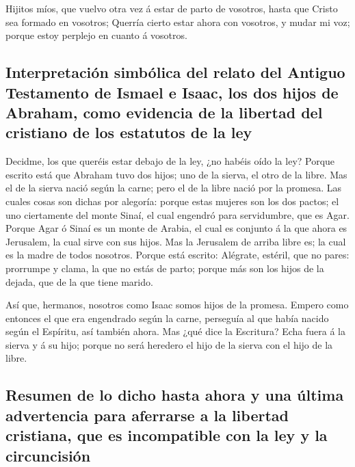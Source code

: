  Hijitos míos, que vuelvo otra vez á estar de parto de
vosotros, hasta que Cristo sea formado en vosotros; 
Querría cierto estar ahora con vosotros, y mudar mi voz; porque estoy
perplejo en cuanto á vosotros.

\hypertarget{interpretaciuxf3n-simbuxf3lica-del-relato-del-antiguo-testamento-de-ismael-e-isaac-los-dos-hijos-de-abraham-como-evidencia-de-la-libertad-del-cristiano-de-los-estatutos-de-la-ley}{%
\subsection{Interpretación simbólica del relato del Antiguo Testamento
de Ismael e Isaac, los dos hijos de Abraham, como evidencia de la
libertad del cristiano de los estatutos de la
ley}\label{interpretaciuxf3n-simbuxf3lica-del-relato-del-antiguo-testamento-de-ismael-e-isaac-los-dos-hijos-de-abraham-como-evidencia-de-la-libertad-del-cristiano-de-los-estatutos-de-la-ley}}

 Decidme, los que queréis estar debajo de la ley, ¿no
habéis oído la ley?  Porque escrito está que Abraham tuvo
dos hijos; uno de la sierva, el otro de la libre.  Mas el
de la sierva nació según la carne; pero el de la libre nació por la
promesa.  Las cuales cosas son dichas por alegoría: porque
estas mujeres son los dos pactos; el uno ciertamente del monte Sinaí, el
cual engendró para servidumbre, que es Agar.  Porque Agar ó
Sinaí es un monte de Arabia, el cual es conjunto á la que ahora es
Jerusalem, la cual sirve con sus hijos.  Mas la Jerusalem
de arriba libre es; la cual es la madre de todos nosotros. 
Porque está escrito: Alégrate, estéril, que no pares: prorrumpe y clama,
la que no estás de parto; porque más son los hijos de la dejada, que de
la que tiene marido.

 Así que, hermanos, nosotros como Isaac somos hijos de la
promesa.  Empero como entonces el que era engendrado según
la carne, perseguía al que había nacido según el Espíritu, así también
ahora.  Mas ¿qué dice la Escritura? Echa fuera á la sierva
y á su hijo; porque no será heredero el hijo de la sierva con el hijo de
la libre.

\hypertarget{resumen-de-lo-dicho-hasta-ahora-y-una-uxfaltima-advertencia-para-aferrarse-a-la-libertad-cristiana-que-es-incompatible-con-la-ley-y-la-circuncisiuxf3n}{%
\subsection{Resumen de lo dicho hasta ahora y una última advertencia
para aferrarse a la libertad cristiana, que es incompatible con la ley y
la
circuncisión}\label{resumen-de-lo-dicho-hasta-ahora-y-una-uxfaltima-advertencia-para-aferrarse-a-la-libertad-cristiana-que-es-incompatible-con-la-ley-y-la-circuncisiuxf3n}}


